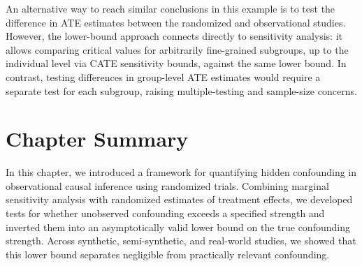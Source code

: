 An alternative way to reach similar conclusions in this example is to test the difference in ATE estimates between the randomized and observational studies. However, the lower-bound approach connects directly to sensitivity analysis: it allows comparing critical values for arbitrarily fine-grained subgroups, up to the individual level via CATE sensitivity bounds, against the same lower bound. In contrast, testing differences in group-level ATE estimates would require a separate test for each subgroup, raising multiple-testing and sample-size concerns.

\FloatBarrier

\section{Chapter Summary}

In this chapter, we introduced a framework for quantifying hidden confounding in observational causal inference using randomized trials. Combining marginal sensitivity analysis with randomized estimates of treatment effects, we developed tests for whether unobserved confounding exceeds a specified strength and inverted them into an asymptotically valid lower bound on the true confounding strength. Across synthetic, semi-synthetic, and real-world studies, we showed that this lower bound separates negligible from practically relevant confounding.
